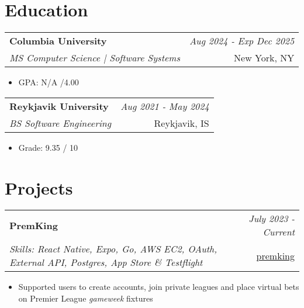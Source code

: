 \documentclass{article}
\makeatletter
\newcommand{\resumeSubheading}[4]{
\vspace{0.5mm}
    \begin{tabular*}{0.98\textwidth}[t]{l@{\extracolsep{\fill}}r}
        \textbf{#1} & \textit{\footnotesize{#4}} \\
        \textit{\footnotesize{#3}} &  \footnotesize{#2}\\
    \end{tabular*}
    \vspace{-2.4mm}
}
\newcommand{\resumeProject}[4]{
\vspace{0.5mm}
    \begin{tabular*}{0.98\textwidth}[t]{l@{\extracolsep{\fill}}r}
        \textbf{#1} & \textit{\footnotesize{#3}} \\
        \footnotesize{\textit{#2}} & \footnotesize{#4}
    \end{tabular*}
    \vspace{-2.4mm}
}
\newcommand{\resumeSubHeadingListStart}{}
\newcommand{\resumeItemListStart}{\begin{itemize}[leftmargin=*,labelsep=1mm,itemsep=0.5mm]}
\newcommand{\resumeSubHeadingListEnd}{}
\newcommand{\resumeItemListEnd}{\end{itemize}\vspace{-2mm}}
\newcommand{\socialicon}[1]{\raisebox{-0.05em}{\resizebox{!}{1em}{#1}}}
\makeatother
\begin{document}
  \resumeSubHeadingListEnd
\vspace{-4mm}

\section{\textbf{Education}}
\vspace{-0.4mm}
\resumeSubHeadingListStart

\resumeSubheading
{Columbia University}{New York, NY}
{MS Computer Science | Software Systems}{Aug 2024 - Exp Dec 2025}
\resumeItemListStart
\item GPA: N/A /4.00
\resumeItemListEnd

\resumeSubheading
{Reykjavik University}{Reykjavik, IS}
{BS Software Engineering}{Aug 2021 - May 2024}
\resumeItemListStart
    \item Grade: 9.35 / 10
\resumeItemListEnd


\resumeSubHeadingListEnd
\vspace{-4mm}

\section{\textbf{Projects}}
\vspace{-0.4mm}
\resumeSubHeadingListStart

\resumeProject
  {PremKing}
  {Skills: React Native, Expo, Go, AWS EC2, OAuth, External API, Postgres, App Store \& Testflight}
  {July 2023 - Current}
  {\socialicon{\faGithub} \href{https://github.com/kristo-og-logi/premking}{premking}}
\resumeItemListStart
\item Supported users to create accounts, join private leagues and place virtual bets on Premier League \emph{gameweek} fixtures
\resumeItemListEnd
\end{document}
